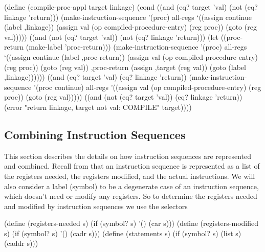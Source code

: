 \begin{codeBlock}
(define (compile-proc-appl target linkage)
  (cond ((and (eq? target 'val)
              (not (eq? linkage 'return)))
         (make-instruction-sequence
           '(proc) all-regs
           `((assign continue (label ,linkage))
             (assign val
                     (op compiled-procedure-entry)
                     (reg proc))
             (goto (reg val)))))
        ((and (not (eq? target 'val))
              (not (eq? linkage 'return)))
         (let ((proc-return (make-label 'proc-return)))
           (make-instruction-sequence
             '(proc) all-regs
             `((assign continue
                       (label ,proc-return))
               (assign val
                       (op compiled-procedure-entry)
                       (reg proc))
               (goto (reg val))
               ,proc-return
               (assign ,target
                       (reg val))
               (goto (label ,linkage))))))
        ((and (eq? target 'val)
              (eq? linkage 'return))
         (make-instruction-sequence
           '(proc continue)
           all-regs
           '((assign val
                     (op compiled-procedure-entry)
                     (reg proc))
             (goto (reg val)))))
        ((and (not (eq? target 'val))
              (eq? linkage 'return))
         (error
           "return linkage, target not val: COMPILE"
           target))))
\end{codeBlock}

\subsection{Combining Instruction Sequences}
\label{Section 5.5.4}

This section describes the details on how instruction sequences are represented
and combined.  Recall from  that an instruction sequence is
represented as a list of the registers needed, the registers modified, and the
actual instructions.  We will also consider a label (symbol) to be a degenerate
case of an instruction sequence, which doesn't need or modify any registers.
So to determine the registers needed and modified by instruction sequences we
use the selectors

\begin{codeBlock}
(define (registers-needed s)
  (if (symbol? s) '() (car s)))
(define (registers-modified s)
  (if (symbol? s) '() (cadr s)))
(define (statements s)
  (if (symbol? s) (list s) (caddr s)))
\end{codeBlock}

